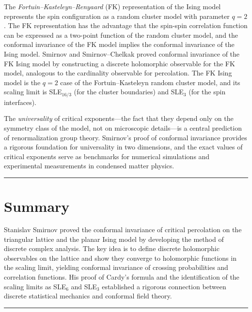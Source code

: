 The \emph{Fortuin--Kasteleyn--Renyaard} (FK) representation of the Ising model represents the spin configuration as a random cluster model with parameter $q = 2$. The FK representation has the advantage that the spin-spin correlation function can be expressed as a two-point function of the random cluster model, and the conformal invariance of the FK model implies the conformal invariance of the Ising model. Smirnov and Smirnov--Chelkak proved conformal invariance of the FK Ising model by constructing a discrete holomorphic observable for the FK model, analogous to the cardinality observable for percolation. The FK Ising model is the $q = 2$ case of the Fortuin--Kasteleyn random cluster model, and its scaling limit is SLE$_{16/3}$ (for the cluster boundaries) and SLE$_3$ (for the spin interfaces).

The \emph{universality} of critical exponents---the fact that they depend only on the symmetry class of the model, not on microscopic details---is a central prediction of renormalization group theory. Smirnov's proof of conformal invariance provides a rigorous foundation for universality in two dimensions, and the exact values of critical exponents serve as benchmarks for numerical simulations and experimental measurements in condensed matter physics.

\begin{center}\rule{0.5\linewidth}{0.5pt}\end{center}

\section*{Summary}

Stanislav Smirnov proved the conformal invariance of critical percolation on the triangular lattice and the planar Ising model by developing the method of discrete complex analysis. The key idea is to define discrete holomorphic observables on the lattice and show they converge to holomorphic functions in the scaling limit, yielding conformal invariance of crossing probabilities and correlation functions. His proof of Cardy's formula and the identification of the scaling limits as SLE$_6$ and SLE$_3$ established a rigorous connection between discrete statistical mechanics and conformal field theory.

\begin{center}\rule{0.5\linewidth}{0.5pt}\end{center}
